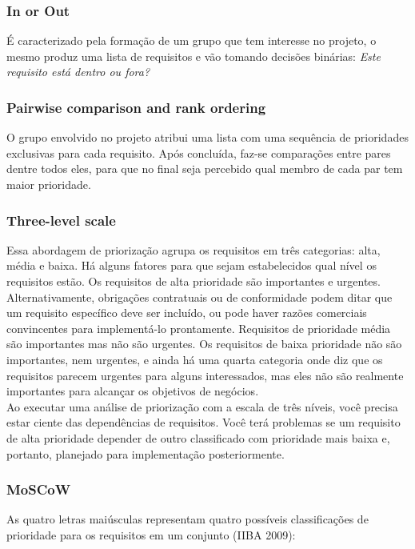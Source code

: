 \documentclass[runningheads]{llncs}
\begin{document}
\subsubsection{In or Out}
É caracterizado pela formação de um grupo que tem interesse no projeto, o mesmo produz uma lista de requisitos e vão tomando decisões binárias: \textit{Este requisito está dentro ou fora?}

\subsubsection{Pairwise comparison and rank ordering}
O grupo envolvido no projeto atribui uma lista com uma sequência de prioridades exclusivas para cada requisito. Após concluída, faz-se comparações entre pares dentre todos eles, para que no final seja percebido qual membro de cada par tem maior prioridade.

\subsubsection{Three-level scale}
Essa abordagem de priorização agrupa os requisitos em três categorias: alta, média e baixa. Há alguns fatores para que sejam estabelecidos qual nível os requisitos estão. Os requisitos de alta prioridade são importantes e urgentes. Alternativamente, obrigações contratuais ou de conformidade podem ditar que um requisito específico deve ser incluído, ou pode haver razões comerciais convincentes para implementá-lo prontamente. Requisitos de prioridade média são importantes mas não são urgentes. Os requisitos de baixa prioridade não são importantes, nem urgentes, e ainda há uma quarta categoria onde diz que os requisitos parecem urgentes para alguns interessados, mas eles não são realmente importantes para alcançar os objetivos de negócios.\\

Ao executar uma análise de priorização com a escala de três níveis, você precisa estar ciente das dependências de requisitos. Você terá problemas se um requisito de alta prioridade depender de outro classificado com prioridade mais baixa e, portanto, planejado para implementação posteriormente.

\subsubsection{MoSCoW}
As quatro letras maiúsculas representam quatro possíveis classificações de prioridade para os requisitos em um conjunto (IIBA 2009): 
\end{document}
